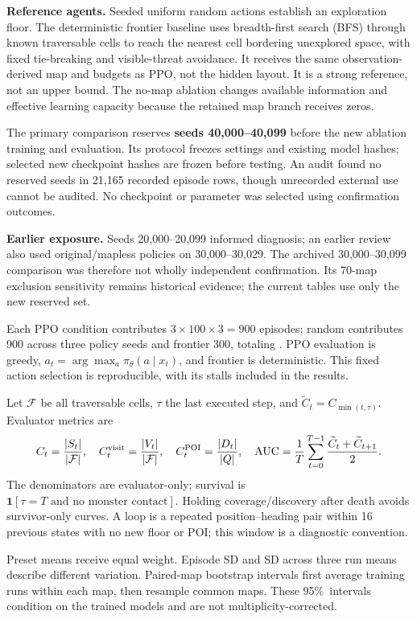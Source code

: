 \documentclass[10pt,a4paper]{article}
\newcommand{\pct}{\%}
\newcommand{\heading}[1]{\vspace{5pt}{\large\bfseries\color{ink}#1}\par\vspace{1pt}}
\newcommand{\subheading}[1]{\textbf{\color{ink}#1}\enspace}
\begin{document}
\subheading{Reference agents.} Seeded uniform random actions establish an exploration floor. The deterministic frontier baseline uses breadth-first search (BFS) through known traversable cells to reach the nearest cell bordering unexplored space, with fixed tie-breaking and visible-threat avoidance. It receives the same observation-derived map and budgets as PPO, not the hidden layout. It is a strong reference, not an upper bound. The no-map ablation changes available information and effective learning capacity because the retained map branch receives zeros.

\heading{6\quad Evaluation protocol}
The primary comparison reserves \textbf{seeds 40,000--40,099} before the new ablation training and evaluation. Its protocol freezes settings and existing model hashes; selected new checkpoint hashes are frozen before testing. An audit found no reserved seeds in 21,165 recorded episode rows, though unrecorded external use cannot be audited. No checkpoint or parameter was selected using confirmation outcomes.

\textbf{Earlier exposure.} Seeds 20,000--20,099 informed diagnosis; an earlier review also used original/mapless policies on 30,000--30,029. The archived 30,000--30,099 comparison was therefore not wholly independent confirmation. Its 70-map exclusion sensitivity remains historical evidence; the current tables use only the new reserved set.

Each PPO condition contributes $3\times100\times3=900$ episodes; random contributes 900 across three policy seeds and frontier 300, totaling \PrimaryEpisodes. PPO evaluation is greedy, $a_t=\arg\max_a\pi_\theta(a\mid x_t)$, and frontier is deterministic. This fixed action selection is reproducible, with its stalls included in the results.

Let $\mathcal F$ be all traversable cells, $\tau$ the last executed step, and $\widetilde C_t=C_{\min(t,\tau)}$. Evaluator metrics are
\[
 C_t=\frac{|S_t|}{|\mathcal F|},\quad C_t^{\rm visit}=\frac{|V_t|}{|\mathcal F|},\quad
 C_t^{\rm POI}=\frac{|D_t|}{|Q|},\quad
 \operatorname{AUC}=\frac1T\sum_{t=0}^{T-1}\frac{\widetilde C_t+\widetilde C_{t+1}}2.
\]
The denominators are evaluator-only; survival is $\mathbf1[\tau=T\text{ and no monster contact}]$. Holding coverage/discovery after death avoids survivor-only curves. A loop is a repeated position--heading pair within 16 previous states with no new floor or POI; this window is a diagnostic convention.

Preset means receive equal weight. Episode SD and SD across three run means describe different variation. Paired-map bootstrap intervals first average training runs within each map, then resample common maps. These 95\pct\ intervals condition on the trained models and are not multiplicity-corrected.
\end{document}
